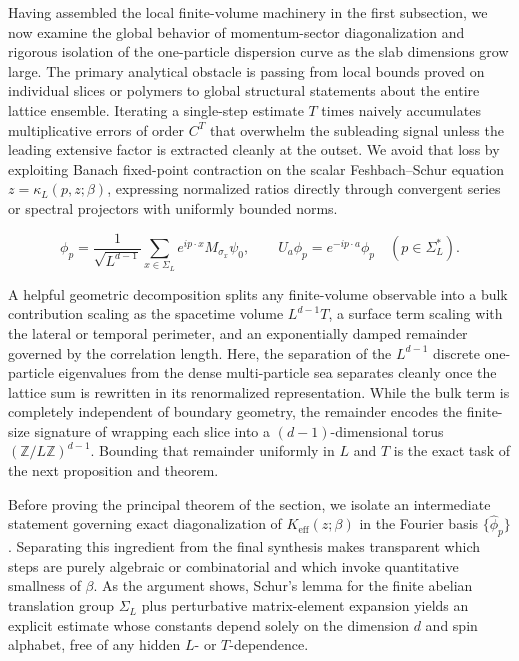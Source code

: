 \documentclass[11pt]{article}
\theoremstyle{definition}
\begin{document}
Having assembled the local finite-volume machinery in the first subsection, we now
examine the global behavior of momentum-sector diagonalization and rigorous
isolation of the one-particle dispersion curve as the slab dimensions grow large.
The primary analytical obstacle is passing from local bounds proved on individual
slices or polymers to global structural statements about the entire lattice
ensemble. Iterating a single-step estimate $T$ times naively accumulates
multiplicative errors of order $C^T$ that overwhelm the subleading signal unless the
leading extensive factor is extracted cleanly at the outset. We avoid that loss by
exploiting Banach fixed-point contraction on the scalar Feshbach--Schur equation $z
= \kappa_L(p, z; \beta)$, expressing normalized ratios directly through convergent
series or spectral projectors with uniformly bounded norms.

\[
  \phi_p = \frac{1}{\sqrt{L^{d-1}}} \sum_{x \in \Sigma_L} e^{i p \cdot x} M_{\sigma_x} \psi_0, \qquad U_a \phi_p = e^{-i p \cdot a} \phi_p \quad (p \in \Sigma_L^*).
\]

A helpful geometric decomposition splits any finite-volume observable into a bulk
contribution scaling as the spacetime volume $L^{d-1} T$, a surface term scaling
with the lateral or temporal perimeter, and an exponentially damped remainder
governed by the correlation length. Here, the separation of the $L^{d-1}$ discrete
one-particle eigenvalues from the dense multi-particle sea separates cleanly once
the lattice sum is rewritten in its renormalized representation. While the bulk term
is completely independent of boundary geometry, the remainder encodes the
finite-size signature of wrapping each slice into a $(d-1)$-dimensional torus
$(\mathbb{Z}/L\mathbb{Z})^{d-1}$. Bounding that remainder uniformly in $L$ and $T$
is the exact task of the next proposition and theorem.

Before proving the principal theorem of the section, we isolate an intermediate
statement governing exact diagonalization of $K_{\mathrm{eff}}(z; \beta)$ in the
Fourier basis $\{\widehat{\phi}_p\}$. Separating this ingredient from the final
synthesis makes transparent which steps are purely algebraic or combinatorial and
which invoke quantitative smallness of $\beta$. As the argument shows, Schur's lemma
for the finite abelian translation group $\Sigma_L$ plus perturbative matrix-element
expansion yields an explicit estimate whose constants depend solely on the dimension
$d$ and spin alphabet, free of any hidden $L$- or $T$-dependence.
\end{document}
